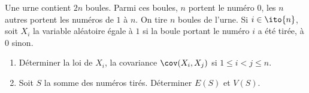 \begin{enonce}
\begin{exercise}[ID={RMS127 E1144},subtitle={Centrale PC 2016},tags={}]
Une urne contient $2n$ boules.
Parmi ces boules, $n$ portent le numéro $0$, les $n$ autres portent les numéros de $1$ à $n$.
On tire $n$ boules de l'urne.
  Si $i\in\ito{n}$, soit $X_i$ la variable aléatoire égale à $1$ si la boule portant le numéro $i$ a été tirée, à $0$ sinon.
  \begin{enumerate}
    \item Déterminer la loi de $X_i$, la covariance $\cov(X_i, X_j)$ si $1\leq i<j\leq n$.

    \item Soit $S$ la somme des numéros tirés.
      Déterminer $E(S)$ et $V(S)$.
  \end{enumerate}
\end{exercise}
\begin{solution}
\end{solution}
\end{enonce}
